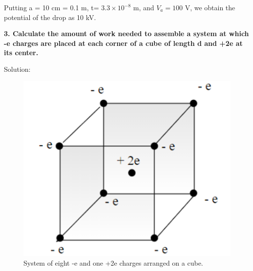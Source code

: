 Putting a = 10 cm = 0.1 m, t= $3.3 \times 10^{-8}$ m, and $V_a = 100$ V, we obtain the potential of the drop as 10 kV.\\
\pagebreak

\begin{tcolorbox}
\textbf{3. Calculate the amount of work needed to assemble a system at which -e charges are placed at each corner of a cube of length d and +2e at its center. }
\end{tcolorbox}
Solution:\\

\begin{figure}[h]
    \centering
    \includegraphics[scale = 0.59]{figures/Sandesh's Figures/fig4.png}
    \caption{System of eight -e and one +2e charges arranged on a cube.}
    \label{fig4}
\end{figure}



